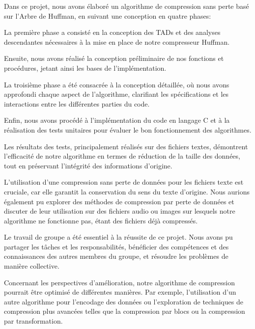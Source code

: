 
Dans ce projet, nous avons élaboré un algorithme de compression sans perte basé sur l'Arbre de Huffman, en suivant une conception en quatre phases:

    La première phase a consisté en la conception des TADs et des analyses descendantes nécessaires à la mise en place de notre compresseur Huffman.

    Ensuite, nous avons réalisé la conception préliminaire de nos fonctions et procédures, jetant ainsi les bases de l'implémentation.

    La troisième phase a été consacrée à la conception détaillée, où nous avons approfondi chaque aspect de l'algorithme, clarifiant les spécifications et les interactions entre les différentes parties du code.

    Enfin, nous avons procédé à l'implémentation du code en langage C et à la réalisation des tests unitaires pour évaluer le bon fonctionnement des algorithmes.

Les résultats des tests, principalement réalisés sur des fichiers textes, démontrent l'efficacité de notre algorithme en termes de réduction de la taille des données, tout en préservant l'intégrité des informations d'origine.

L'utilisation d'une compression sans perte de données pour les fichiers texte est cruciale, car elle garantit la conservation du sens du texte d'origine. Nous aurions également pu explorer des méthodes de compression par perte de données et discuter de leur utilisation sur des fichiers audio ou images sur lesquels notre algorithme ne fonctionne pas, étant des fichiers déjà compressés.

Le travail de groupe a été essentiel à la réussite de ce projet. Nous avons pu partager les tâches et les responsabilités, bénéficier des compétences et des connaissances des autres membres du groupe, et résoudre les problèmes de manière collective.

Concernant les perspectives d'amélioration, notre algorithme de compression pourrait être optimisé de différentes manières. Par exemple, l'utilisation d'un autre algorithme pour l'encodage des données ou l'exploration de techniques de compression plus avancées telles que la compression par blocs ou la compression par transformation.


